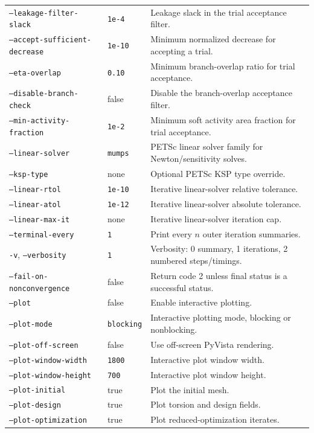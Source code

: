 \documentclass[11pt]{article}
\begin{document}
\begin{longtable}{>{\raggedright\arraybackslash}p{}
                  >{\raggedright\arraybackslash}p{}
                  >{\raggedright\arraybackslash}p{}}
\texttt{--leakage-filter-slack} & \texttt{1e-4} & Leakage slack in the trial acceptance filter. \\
\texttt{--accept-sufficient-decrease} & \texttt{1e-10} & Minimum normalized decrease for accepting a trial. \\
\texttt{--eta-overlap} & \texttt{0.10} & Minimum branch-overlap ratio for trial acceptance. \\
\texttt{--disable-branch-check} & false & Disable the branch-overlap acceptance filter. \\
\texttt{--min-activity-fraction} & \texttt{1e-2} & Minimum soft activity area fraction for trial acceptance. \\
\texttt{--linear-solver} & \texttt{mumps} & PETSc linear solver family for Newton/sensitivity solves. \\
\texttt{--ksp-type} & none & Optional PETSc KSP type override. \\
\texttt{--linear-rtol} & \texttt{1e-10} & Iterative linear-solver relative tolerance. \\
\texttt{--linear-atol} & \texttt{1e-12} & Iterative linear-solver absolute tolerance. \\
\texttt{--linear-max-it} & none & Iterative linear-solver iteration cap. \\
\texttt{--terminal-every} & \texttt{1} & Print every $n$ outer iteration summaries. \\
\texttt{-v}, \texttt{--verbosity} & \texttt{1} & Verbosity: 0 summary, 1 iterations, 2 numbered steps/timings. \\
\texttt{--fail-on-nonconvergence} & false & Return code 2 unless final status is a successful status. \\
\texttt{--plot} & false & Enable interactive plotting. \\
\texttt{--plot-mode} & \texttt{blocking} & Interactive plotting mode, blocking or nonblocking. \\
\texttt{--plot-off-screen} & false & Use off-screen PyVista rendering. \\
\texttt{--plot-window-width} & \texttt{1800} & Interactive plot window width. \\
\texttt{--plot-window-height} & \texttt{700} & Interactive plot window height. \\
\texttt{--plot-initial} & true & Plot the initial mesh. \\
\texttt{--plot-design} & true & Plot torsion and design fields. \\
\texttt{--plot-optimization} & true & Plot reduced-optimization iterates. \\

\end{longtable}
\end{document}
